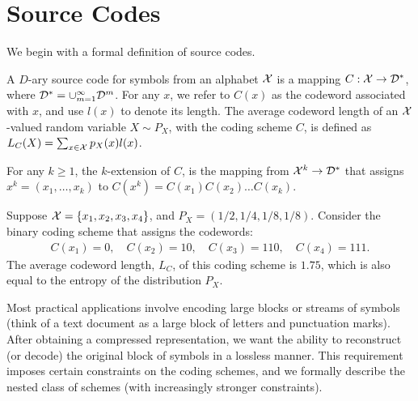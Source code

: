 \section{Source Codes}
    We begin with a formal definition of source codes. 
    \begin{definition}
        \label{def:source-codes}  A $D$-ary source code for symbols from an alphabet $\mathcal{X}$ is a mapping $C:\mathcal{X} \to \mathcal{D}^*$, where $\mathcal{D}^* = \cup_{m=1}^\infty \mathcal{D}^m$.  For any $x$, we refer to $C(x)$ as the codeword associated with $x$, and use $l(x)$ to denote its length. The average codeword length of an $\mathcal{X}$-valued random variable $X \sim P_X$, with the coding scheme $C$, is defined as $L_C(X) = \sum_{x \in \mathcal{X}} p_X(x) l(x)$. 

        For any $k \geq 1$, the $k$-extension of $C$, is the mapping from $\mathcal{X}^k \to \mathcal{D}^*$ that assigns $x^k = (x_1, \ldots, x_k)$ to $C(x^k) = C(x_1)C(x_2)\ldots C(x_k)$. 
    \end{definition}
    \begin{example}
        \label{example:source-codes-1} Suppose $\mathcal{X} = \{x_1, x_2, x_3, x_4\}$, and $P_X = (1/2, 1/4, 1/8, 1/8)$. Consider the binary coding scheme that assigns the codewords: 
        \begin{align}
            C(x_1) = 0, \quad C(x_2) = 10, \quad C(x_3) = 110, \quad C(x_4) = 111. 
        \end{align}
        The average codeword length, $L_{C}$, of this coding scheme is $1.75$, which is also equal to the entropy of the distribution $P_X$. 
    \end{example}
    Most practical applications involve encoding large blocks or streams of symbols (think of a text document as a large block of letters and punctuation marks). After obtaining a compressed representation, we want the ability to reconstruct (or decode) the original block of symbols in a lossless manner. This requirement imposes certain constraints on the coding schemes, and we formally describe the nested class of schemes (with increasingly stronger constraints).   

